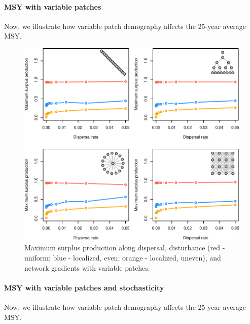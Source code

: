 \documentclass[
]{article}
\begin{document}
\newpage

\hypertarget{msy-with-variable-patches}{%
\paragraph{MSY with variable patches}\label{msy-with-variable-patches}}

Now, we illustrate how variable patch demography affects the 25-year
average MSY.

\begin{figure}[H]

{\centering \includegraphics{Managing_for_ecological_surprises_in_metapopulations_files/figure-latex/MSY with variable patches-1} 

}

\caption{Maximum surplus production along dispersal, disturbance (red - uniform; blue - localized, even; orange - localized, uneven), and network gradients with variable patches.}\label{fig:MSY with variable patches}
\end{figure}
\newpage

\hypertarget{msy-with-variable-patches-and-stochasticity}{%
\paragraph{MSY with variable patches and
stochasticity}\label{msy-with-variable-patches-and-stochasticity}}

Now, we illustrate how variable patch demography affects the 25-year
average MSY.
\end{document}
